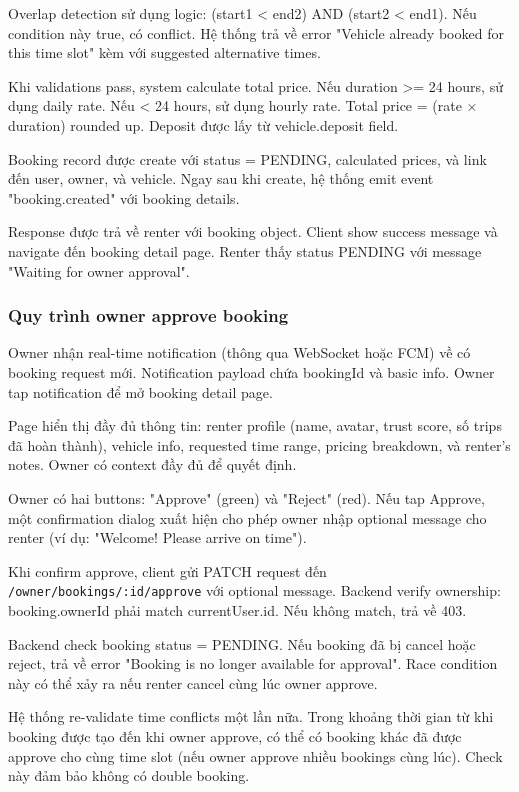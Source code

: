 Overlap detection sử dụng logic: (start1 < end2) AND (start2 < end1). Nếu condition này true, có conflict. Hệ thống trả về error "Vehicle already booked for this time slot" kèm với suggested alternative times.

Khi validations pass, system calculate total price. Nếu duration >= 24 hours, sử dụng daily rate. Nếu < 24 hours, sử dụng hourly rate. Total price = (rate $\times$ duration) rounded up. Deposit được lấy từ vehicle.deposit field.

Booking record được create với status = PENDING, calculated prices, và link đến user, owner, và vehicle. Ngay sau khi create, hệ thống emit event "booking.created" với booking details.

Response được trả về renter với booking object. Client show success message và navigate đến booking detail page. Renter thấy status PENDING với message "Waiting for owner approval".

\subsubsection{Quy trình owner approve booking}
Owner nhận real-time notification (thông qua WebSocket hoặc FCM) về có booking request mới. Notification payload chứa bookingId và basic info. Owner tap notification để mở booking detail page.

Page hiển thị đầy đủ thông tin: renter profile (name, avatar, trust score, số trips đã hoàn thành), vehicle info, requested time range, pricing breakdown, và renter's notes. Owner có context đầy đủ để quyết định.

Owner có hai buttons: "Approve" (green) và "Reject" (red). Nếu tap Approve, một confirmation dialog xuất hiện cho phép owner nhập optional message cho renter (ví dụ: "Welcome! Please arrive on time").

Khi confirm approve, client gửi PATCH request đến \texttt{/owner/bookings/:id/approve} với optional message. Backend verify ownership: booking.ownerId phải match currentUser.id. Nếu không match, trả về 403.

Backend check booking status = PENDING. Nếu booking đã bị cancel hoặc reject, trả về error "Booking is no longer available for approval". Race condition này có thể xảy ra nếu renter cancel cùng lúc owner approve.

Hệ thống re-validate time conflicts một lần nữa. Trong khoảng thời gian từ khi booking được tạo đến khi owner approve, có thể có booking khác đã được approve cho cùng time slot (nếu owner approve nhiều bookings cùng lúc). Check này đảm bảo không có double booking.

